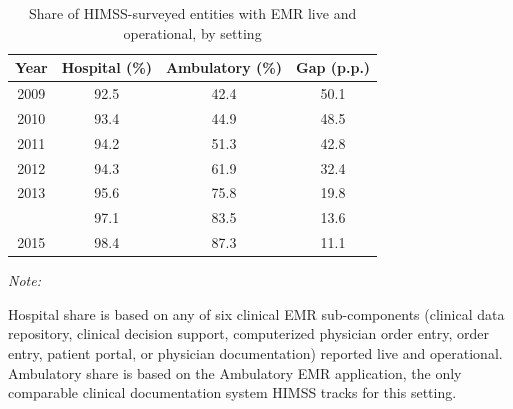 \begin{table}[!h]
\centering
\caption{\label{tab:himss_timing}Share of HIMSS-surveyed entities with EMR live and operational, by setting}
\centering
\begin{threeparttable}
\begin{tabular}[t]{cccc}
\toprule
Year & Hospital (\%) & Ambulatory (\%) & Gap (p.p.)\\
\midrule
2009 & 92.5 & 42.4 & 50.1\\
2010 & 93.4 & 44.9 & 48.5\\
2011 & 94.2 & 51.3 & 42.8\\
2012 & 94.3 & 61.9 & 32.4\\
2013 & 95.6 & 75.8 & 19.8\\
\addlinespace
2014 & 97.1 & 83.5 & 13.6\\
2015 & 98.4 & 87.3 & 11.1\\
\bottomrule
\end{tabular}
\begin{tablenotes}
\item \textit{Note: } 
\item Hospital share is based on any of six clinical EMR sub-components (clinical data repository, clinical decision support, computerized physician order entry, order entry, patient portal, or physician documentation) reported live and operational. Ambulatory share is based on the Ambulatory EMR application, the only comparable clinical documentation system HIMSS tracks for this setting.
\end{tablenotes}
\end{threeparttable}
\end{table}

